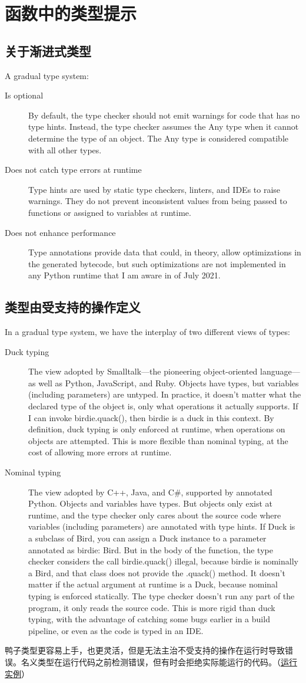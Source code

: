 \chapter{函数中的类型提示}
\section{关于渐进式类型}
A gradual type system:
\begin{description}
    \item[Is optional] By default, the type checker should not emit warnings for code that has no type hints. Instead, the type checker assumes the Any type when it cannot determine the type of an object. The Any type is considered compatible with all other types.
    \item[Does not catch type errors at runtime] Type hints are used by static type checkers, linters, and IDEs to raise warnings. They do not prevent inconsistent values from being passed to functions or assigned to variables at runtime.
    \item[Does not enhance performance] Type annotations provide data that could, in theory, allow optimizations in the generated bytecode, but such optimizations are not implemented in any Python runtime that I am aware in of July 2021.
\end{description}
\section{类型由受支持的操作定义}
In a gradual type system, we have the interplay of two different views of types:
\begin{description}
    \item[Duck typing] The view adopted by Smalltalk—the pioneering object-oriented language—as well as Python, JavaScript, and Ruby. Objects have types, but variables (including parameters) are untyped. In practice, it doesn't matter what the declared type of the object is, only what operations it actually supports. If I can invoke birdie.quack(), then birdie is a duck in this context. By definition, duck typing is only enforced at runtime, when operations on objects are attempted. This is more flexible than nominal typing, at the cost of allowing more errors at runtime.
    \item[Nominal typing] The view adopted by C++, Java, and C\#, supported by annotated Python. Objects and variables have types. But objects only exist at runtime, and the type checker only cares about the source code where variables (including parameters) are annotated with type hints. If Duck is a subclass of Bird, you can assign a Duck instance to a parameter annotated as birdie: Bird. But in the body of the function, the type checker considers the call birdie.quack() illegal, because birdie is nominally a Bird, and that class does not provide the .quack() method. It doesn't matter if the actual argument at runtime is a Duck, because nominal typing is enforced statically. The type checker doesn't run any part of the program, it only reads the source code. This is more rigid than duck typing, with the advantage of catching some bugs earlier in a build pipeline, or even as the code is typed in an IDE.
\end{description}

鸭子类型更容易上手，也更灵活，但是无法主治不受支持的操作在运行时导致错误。名义类型在运行代码之前检测错误，但有时会拒绝实际能运行的代码。（\href{}{运行实例}）